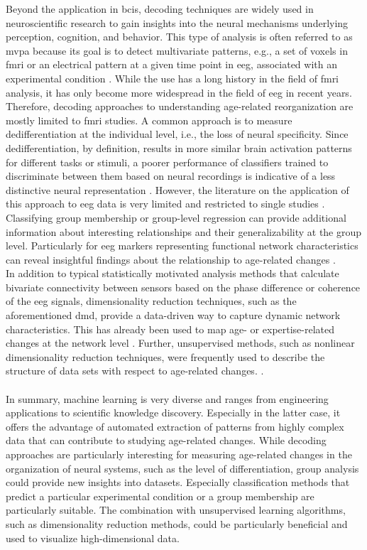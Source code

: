 Beyond the application in \glspl{bci}, decoding techniques are widely used in neuroscientific research to gain insights into the neural mechanisms underlying perception, cognition, and behavior. This type of analysis is often referred to as \gls{mvpa} because its goal is to detect multivariate patterns, e.g., a set of voxels in \gls{fmri} or an electrical pattern at a given time point in \gls{eeg}, associated with an experimental condition \cite{Holdgraf2017}. While the use has a long history in the field of \gls{fmri} analysis, it has only become more widespread in the field of \gls{eeg} in recent years. Therefore, decoding approaches to understanding age-related reorganization are mostly limited to \gls{fmri} studies. A common approach is to measure dedifferentiation at the individual level, i.e., the loss of neural specificity. Since dedifferentiation, by definition, results in more similar brain activation patterns for different tasks or stimuli, a poorer performance of classifiers trained to discriminate between them based on neural recordings is indicative of a less distinctive neural representation \cite{Koen2019, Park2010}. However, the literature on the application of this approach to \gls{eeg} data is very limited and restricted to single studies \cite{Chen2019}.\\
Classifying group membership or group-level regression can provide additional information about interesting relationships and their generalizability at the group level. Particularly for \gls{eeg} markers representing functional network characteristics can reveal insightful findings about the relationship to age-related changes \cite{Petti2016}.\\
In addition to typical statistically motivated analysis methods that calculate bivariate connectivity between sensors based on the phase difference or coherence of the \gls{eeg} signals, dimensionality reduction techniques, such as the aforementioned \gls{dmd}, provide a data-driven way to capture dynamic network characteristics. This has already been used to map age- or expertise-related changes at the network level \cite{Vieluf2018}. Further, unsupervised methods, such as nonlinear dimensionality reduction techniques, were frequently used to describe the structure of data sets with respect to age-related changes.  \cite{Banville2021,Kottlarz2020}.\\
\\
In summary, machine learning is very diverse and ranges from engineering applications to scientific knowledge discovery. Especially in the latter case, it offers the advantage of automated extraction of patterns from highly complex data that can contribute to studying age-related changes. While decoding approaches are particularly interesting for measuring age-related changes in the organization of neural systems, such as the level of differentiation, group analysis could provide new insights into datasets. Especially classification methods that predict a particular experimental condition or a group membership are particularly suitable. The combination with unsupervised learning algorithms, such as dimensionality reduction methods, could be particularly beneficial and used to visualize high-dimensional data.


